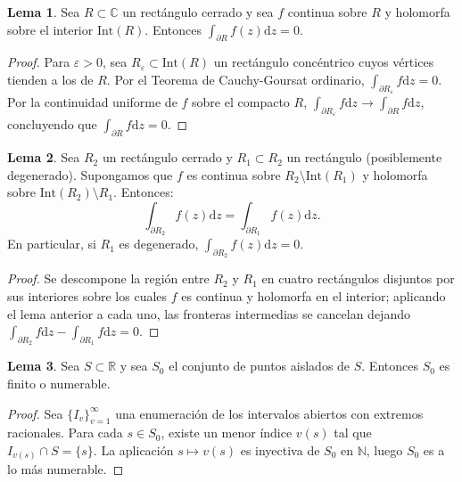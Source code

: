 \documentclass[11pt,a4paper]{article}
\theoremstyle{definition}
\newtheorem{lema}{Lema}[section]
\theoremstyle{remark}
\numberwithin{equation}{section}
\newcommand{\dz}{\mathrm{d}z}
\begin{document}
\begin{lema}
Sea $R \subset \mathbb{C}$ un rectángulo cerrado y sea $f$ continua sobre $R$ y holomorfa sobre el interior $\mathrm{Int}(R)$. Entonces $\int_{\partial R} f(z) \dz = 0$.
\end{lema}
\begin{proof}
Para $\varepsilon > 0$, sea $R_\varepsilon \subset \mathrm{Int}(R)$ un rectángulo concéntrico cuyos vértices tienden a los de $R$. Por el Teorema de Cauchy-Goursat ordinario, $\int_{\partial R_\varepsilon} f \dz = 0$. Por la continuidad uniforme de $f$ sobre el compacto $R$, $\int_{\partial R_\varepsilon} f \dz \to \int_{\partial R} f \dz$, concluyendo que $\int_{\partial R} f \dz = 0$.
\end{proof}

\begin{lema}
Sea $R_2$ un rectángulo cerrado y $R_1 \subset R_2$ un rectángulo (posiblemente degenerado). Supongamos que $f$ es continua sobre $R_2 \setminus \mathrm{Int}(R_1)$ y holomorfa sobre $\mathrm{Int}(R_2) \setminus R_1$. Entonces:
\begin{equation}
\int_{\partial R_2} f(z) \dz = \int_{\partial R_1} f(z) \dz.
\end{equation}
En particular, si $R_1$ es degenerado, $\int_{\partial R_2} f(z) \dz = 0$.
\end{lema}
\begin{proof}
Se descompone la región entre $R_2$ y $R_1$ en cuatro rectángulos disjuntos por sus interiores sobre los cuales $f$ es continua y holomorfa en el interior; aplicando el lema anterior a cada uno, las fronteras intermedias se cancelan dejando $\int_{\partial R_2} f \dz - \int_{\partial R_1} f \dz = 0$.
\end{proof}

\begin{lema}
Sea $S \subset \mathbb{R}$ y sea $S_0$ el conjunto de puntos aislados de $S$. Entonces $S_0$ es finito o numerable.
\end{lema}
\begin{proof}
Sea $\{I_v\}_{v=1}^\infty$ una enumeración de los intervalos abiertos con extremos racionales. Para cada $s \in S_0$, existe un menor índice $v(s)$ tal que $I_{v(s)} \cap S = \{s\}$. La aplicación $s \mapsto v(s)$ es inyectiva de $S_0$ en $\mathbb{N}$, luego $S_0$ es a lo más numerable.
\end{proof}
\end{document}
